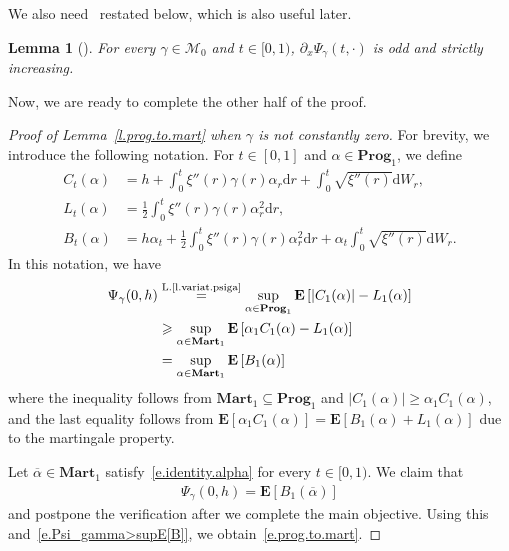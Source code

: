 \documentclass[11pt]{amsart}
\newtheorem{lemma}[proposition]{Lemma}
\theoremstyle{remark}
\theoremstyle{definition}
\numberwithin{equation}{section}
\numberwithin{proposition}{section}
\numberwithin{figure}{section}
\numberwithin{table}{section}
\newcommand{\EE}{\mathbf{E}}
\renewcommand{\geq}{\geqslant}
\renewcommand{\subset}{\subseteq}
\renewcommand{\bar}{\overline}
\newcommand{\Ll}{\left}
\newcommand{\Rr}{\right}
\renewcommand{\d}{\mathrm{d}}
\newcommand{\1}{\mathbf{1}}
\newcommand{\mcl}{\mathcal}
\newcommand{\bprog}{\mathbf{Prog}}
\newcommand{\bmart}{\mathbf{Mart}}
\begin{document}
We also need~\cite[Lemma~4]{chen2017fluctuations} restated below, which is also useful later.

\begin{lemma}[\cite{chen2017fluctuations}]\label{l.d_xPsi_odd_increase}
For every $\gamma\in\mcl M_0$ and $t\in[0,1)$, $\partial_x\Psi_\gamma(t,\cdot)$ is odd and strictly increasing.
\end{lemma}

Now, we are ready to complete the other half of the proof.

\begin{proof}[Proof of Lemma~\ref{l.prog.to.mart} when $\gamma$ is not constantly zero]
For brevity, we introduce the following notation. For $t\in[0,1]$ and $\alpha \in \bprog_1$, we define
\begin{align*}
    C_t(\alpha) & = h+\int_0^t \xi''(r)\gamma(r)\alpha_r\d r+\int_0^t\sqrt{\xi''(r)}\d W_r,
    \\
    L_t(\alpha) &= \frac{1}{2}\int_0^t\xi''(r)\gamma(r)\alpha_r^2\d r,
    \\
    B_t(\alpha) &= h\alpha_t + \frac{1}{2}\int_0^t\xi''(r)\gamma(r)\alpha_r^2\d r+ \alpha_t\int_0^t\sqrt{\xi''(r)}\d W_r.
\end{align*}
In this notation, we have
\begin{align}
    \Psi_\gamma(0,h) & \stackrel{\text{L.\ref{l.variat.psiga}}}{=} \sup_{\alpha\in\bprog_1}\EE \Ll[|C_1(\alpha)|-L_1(\alpha)\Rr]\notag
    \\
    &\geq \sup_{\alpha\in\bmart_1}\EE \Ll[\alpha_1 C_1(\alpha)-L_1(\alpha)\Rr]\notag
    \\
    & = \sup_{\alpha\in\bmart_1}\EE \Ll[B_1(\alpha)\Rr] \label{e.Psi_gamma>supE[B]}
\end{align}
where the inequality follows from $\bmart_1 \subset \bprog_1$ and $|C_1(\alpha)|\geq \alpha_1 C_1(\alpha)$, and the last equality follows from $\EE \Ll[\alpha_1 C_1(\alpha)\Rr] = \EE \Ll[B_1(\alpha) + L_1(\alpha)\Rr]$ due to the martingale property.

Let $\bar\alpha \in\bmart_1$ satisfy~\eqref{e.identity.alpha} for every $t\in[0,1)$.
We claim that
\begin{align}\label{e.claim}
    \Psi_\gamma(0,h) = \EE \Ll[B_1(\bar\alpha)\Rr]
\end{align}
and postpone the verification after we complete the main objective.
Using this and~\eqref{e.Psi_gamma>supE[B]}, we obtain~\eqref{e.prog.to.mart}. 



\end{proof}
\end{document}
